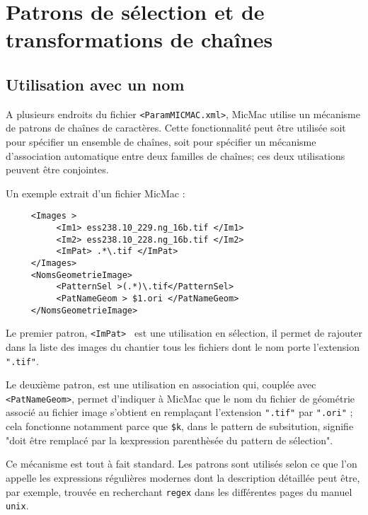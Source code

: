 \newpage
\section{Patrons de s\'election et de transformations de cha\^ines}

\subsection{Utilisation avec un nom}
\label{DU:Regex}

A plusieurs endroits du fichier {\tt <ParamMICMAC.xml>}, MicMac
utilise un m\'ecanisme de  patrons de cha\^ines de caract\`eres.
Cette fonctionnalit\'e  peut  \^etre utilis\'ee soit pour
sp\'ecifier un ensemble de cha\^ines, soit pour sp\'ecifier
un m\'ecanisme d'association automatique entre deux
familles de cha\^ines; ces deux utilisations 
peuvent \^etre conjointes.

Un exemple extrait d'un fichier MicMac :

\begin{verbatim}
     <Images >
          <Im1> ess238.10_229.ng_16b.tif </Im1>
          <Im2> ess238.10_228.ng_16b.tif </Im2>
          <ImPat> .*\.tif </ImPat>
     </Images>
     <NomsGeometrieImage>
          <PatternSel >(.*)\.tif</PatternSel>
          <PatNameGeom > $1.ori </PatNameGeom>
     </NomsGeometrieImage>
\end{verbatim}

Le premier patron, {\tt <ImPat> } est une utilisation en 
s\'election, il permet de rajouter dans la liste des images
du chantier tous les fichiers dont le nom porte l'extension
{\tt ".tif"}.

Le deuxi\`eme  patron, {\tt <PatternSel >} est 
une utilisation en  association qui, coupl\'ee avec 
{\tt <PatNameGeom>}, permet d'indiquer
\`a MicMac que le nom du fichier de g\'eom\'etrie associ\'e
au fichier image s'obtient en rempla\c{c}ant l'extension
{\tt ".tif"} par {\tt ".ori"} ; cela fonctionne notamment parce que {\tt \$k},
dans le pattern de subsitution, signifie "doit \^etre remplac\'e 
par la k\EME expression parenth\`es\'ee du pattern de s\'election".


Ce m\'ecanisme est tout \`a fait standard. Les patrons sont utilis\'es 
selon ce que l'on appelle les expressions r\'eguli\`eres modernes
dont la description d\'etaill\'ee peut \^etre, par exemple,
trouv\'ee en recherchant {\tt regex} dans  les diff\'erentes
pages du manuel {\tt unix}.



